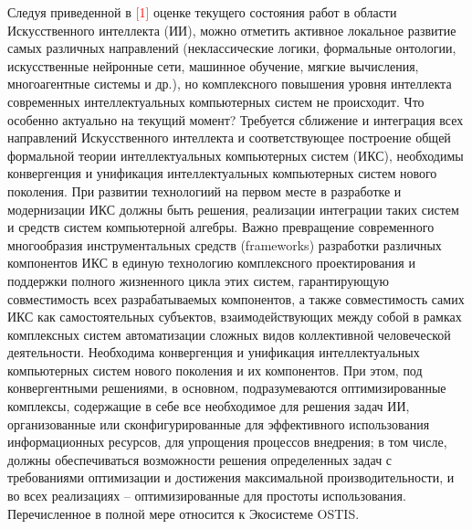 Следуя приведенной в \textcolor{red}{[1]} оценке текущего состояния работ в области Искусственного интеллекта (ИИ), можно отметить активное локальное развитие самых различных направлений (неклассические логики, формальные онтологии, искусственные нейронные сети, машинное обучение, мягкие вычисления, многоагентные системы и др.), но комплексного повышения уровня интеллекта современных интеллектуальных компьютерных систем не происходит. 
Что особенно актуально на текущий момент? 
Требуется сближение и интеграция всех направлений Искусственного интеллекта и соответствующее построение общей формальной теории интеллектуальных компьютерных систем (ИКС), 
необходимы конвергенция и унификация интеллектуальных компьютерных систем нового поколения. При развитии технологиий на первом месте в разработке и модернизации ИКС должны быть решения, реализации интеграции таких систем и средств систем компьютерной алгебры. 
Важно превращение современного многообразия инструментальных средств (frameworks) разработки различных компонентов ИКС в единую технологию комплексного проектирования и поддержки полного жизненного цикла этих систем, гарантирующую совместимость всех разрабатываемых компонентов, а также совместимость самих ИКС как самостоятельных субъектов, взаимодействующих между собой в рамках комплексных систем автоматизации сложных видов коллективной человеческой деятельности. 
Необходима конвергенция и унификация интеллектуальных компьютерных систем нового поколения и их компонентов. 
При этом, под конвергентными решениями, в основном, подразумеваются оптимизированные комплексы, содержащие в себе все необходимое для решения задач ИИ, организованные или сконфигурированные для эффективного использования информационных ресурсов, для упрощения процессов внедрения; в том числе, должны обеспечиваться возможности решения определенных задач с требованиями оптимизации и достижения максимальной производительности, и во всех реализациях – оптимизированные для простоты использования. 
Перечисленное в полной мере относится к Экосистеме OSTIS. 

